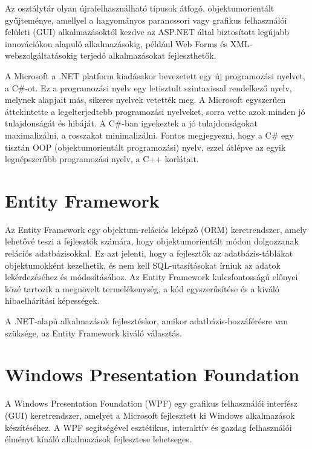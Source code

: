 \documentclass[
]{thesis-ekf}
\theoremstyle{definition}
\theoremstyle{remark}
\begin{document}
Az osztálytár olyan újrafelhasználható típusok átfogó, objektumorientált gyűjteménye, amellyel a hagyományos parancssori vagy grafikus felhasználói felületi (GUI) alkalmazásoktól kezdve az ASP.NET által biztosított legújabb innovációkon alapuló alkalmazásokig, például Web Forms és XML-webszolgáltatásokig terjedő alkalmazásokat fejleszthetők.

A Microsoft a .NET platform kiadásakor bevezetett egy új programozási nyelvet, a C\#-ot. Ez a programozási nyelv egy letisztult szintaxissal rendelkező nyelv, melynek alapjait más, sikeres nyelvek vetették meg. A Microsoft egyszerűen áttekintette a legelterjedtebb programozási nyelveket, sorra vette azok minden jó tulajdonságát és hibáját. A C\#-ban igyekeztek a jó tulajdonságokat maximalizálni, a rosszakat minimalizálni. Fontos megjegyezni, hogy a C\# egy tisztán OOP (objektumorientált programozási) nyelv, ezzel átlépve az egyik legnépszerűbb programozási nyelv, a C++ korlátait.
\section{Entity Framework \cite{Entity}}
Az Entity Framework egy objektum-relációs leképző (ORM) keretrendszer, amely lehetővé teszi a fejlesztők számára, hogy objektumorientált módon dolgozzanak relációs adatbázisokkal. Ez azt jelenti, hogy a fejlesztők az adatbázis-táblákat objektumokként kezelhetik, és nem kell SQL-utasításokat írniuk az adatok lekérdezéséhez és módosításához. Az Entity Framework kulcsfontosságú előnyei közé tartozik a megnövelt termelékenység, a kód egyszerűsítése és a kiváló hibaelhárítási képességek. 

A .NET-alapú alkalmazások fejlesztéskor, amikor adatbázis-hozzáférésre van szüksége, az Entity Framework kiváló választás.
\section{Windows Presentation Foundation}
A Windows Presentation Foundation (WPF) egy grafikus felhasználói interfész (GUI) keretrendszer, amelyet a Microsoft fejlesztett ki Windows alkalmazások készítéséhez. A WPF segitségével esztétikus, interaktív és gazdag felhasználói élményt kínáló alkalmazások fejlesztese lehetseges.
\end{document}

